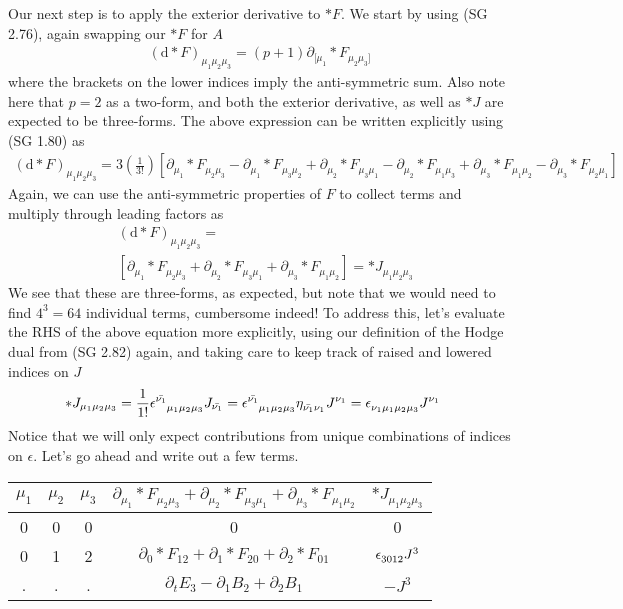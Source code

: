 Our next step is to apply the exterior derivative to $\ast F$. We start by using (SG 2.76), again swapping our $\ast F$ for $A$
%
\begin{align}
	\left(\textrm{d} \ast F\right)_{\mu_1\mu_2\mu_3} = (p+1) \partial_{[\mu_1} \ast F_{\mu_2\mu_3]}
\end{align}
%
where the brackets on the lower indices imply the anti-symmetric sum. Also note here that $p=2$ as a two-form, and both the exterior derivative, as well as $\ast J$ are expected to be three-forms. The above expression can be written explicitly using (SG 1.80) as 
%
\begin{align}
	\left(\textrm{d} \ast F\right)_{\mu_1\mu_2\mu_3} = 3 \left(\frac{1}{3!}\right) \left[ \partial_{\mu_1} \ast F_{\mu_2\mu_3} - \partial_{\mu_1} \ast F_{\mu_3\mu_2} + \partial_{\mu_2} \ast F_{\mu_3\mu_1} - \partial_{\mu_2} \ast F_{\mu_1\mu_3} + \partial_{\mu_3} \ast F_{\mu_1\mu_2} - \partial_{\mu_3} \ast F_{\mu_2\mu_1} \right]
\end{align}
%
Again, we can use the anti-symmetric properties of $F$ to collect terms and multiply through leading factors as 
%
\begin{align}
	&\left(\textrm{d} \ast F\right)_{\mu_1\mu_2\mu_3} = \\ &\left[ \partial_{\mu_1} \ast F_{\mu_2\mu_3} + \partial_{\mu_2} \ast F_{\mu_3\mu_1}  + \partial_{\mu_3} \ast F_{\mu_1\mu_2} \right] = \ast J_{\mu_1\mu_2\mu_3} 
\end{align}
%
We see that these are three-forms, as expected, but note that we would need to find $4^3 = 64$ individual terms, cumbersome indeed! To address this, let's evaluate the RHS of the above equation more explicitly, using our definition of the Hodge dual from (SG 2.82) again, and taking care to keep track of raised and lowered indices on $J$
%
\begin{align}
\ast J_{\mu_1\mu_2\mu_3} &= \frac{1}{1!} \epsilon\indices{^{{\bar{\nu_1}}}_{{\mu_1}{\mu_2}{\mu_3}}} J_{\bar{\nu_1}} 
= \epsilon\indices{^{{\bar{\nu_1}}}_{{\mu_1}{\mu_2}{\mu_3}}} \eta\indices{_{\bar{\nu_1}\nu_1}} J\indices{^{\nu_1}}
= \epsilon\indices{_{{\nu_1}{\mu_1}{\mu_2}{\mu_3}}} J\indices{^{\nu_1}}
\end{align} 
%
Notice that we will only expect contributions from unique combinations of indices on $\epsilon$. Let's go ahead and write out a few terms. 
%
\begin{center}
	\begin{tabular}{| c | c | c | c | c |} 
		\hline
		$\mu_1$ & $\mu_2$ & $\mu_3$ & $\partial_{\mu_1} \ast F_{\mu_2\mu_3} + \partial_{\mu_2} \ast F_{\mu_3\mu_1} + \partial_{\mu_3} \ast F_{\mu_1\mu_2}$ & $\ast J_{\mu_1 \mu_2 \mu_3}$ \\
		\hline\hline
		0 & 0 & 0 & 0 & 0 \\ 
		0 & 1 & 2 & $\partial_{0} \ast F_{12} + \partial_{1} \ast F_{20} + \partial_{2} \ast F_{01}$ & $\epsilon\indices{_{{3}{0}{1}{2}}}J^3$\\
		. & . & . & $\partial_{t} E_3 - \partial_{1} B_2 + \partial_{2} B_1$ & $-J^3$ \\
		\hline
	\end{tabular}
\end{center}
